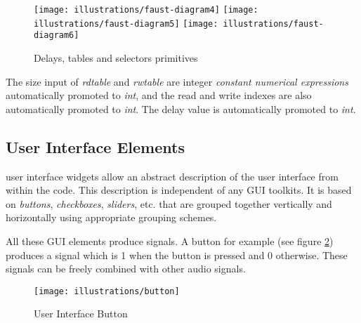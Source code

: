 \begin{figure}
\centering
\texttt{[image: illustrations/faust-diagram4]}
\texttt{[image: illustrations/faust-diagram5]}
\texttt{[image: illustrations/faust-diagram6]}
\caption{Delays, tables and selectors primitives }
\label{fig-delays}
\end{figure}

The size input of \textit{rdtable} and \textit{rwtable} are integer \textit{constant numerical expressions} automatically promoted to \textit{int}, and the read and write indexes are also automatically promoted to \textit{int}. The delay value is automatically promoted to \textit{int}.

\subsection{User Interface Elements}

\faust user interface widgets allow an abstract description of the user interface from within the \faust code. This description is
independent of any GUI toolkits. It is based on \emph{buttons}, \emph{checkboxes}, \emph{sliders}, etc. that are grouped together 
vertically and horizontally using appropriate grouping schemes.

All these GUI elements produce signals. A button for example (see figure \ref{fig-button}) produces a signal which is 1 when the button is pressed and 0 otherwise. These signals can be freely combined with other audio signals. 

\begin{figure}[h]
\centering
\texttt{[image: illustrations/button]}
\caption{User Interface Button}
\label{fig-button}
\end{figure}

\bigskip

